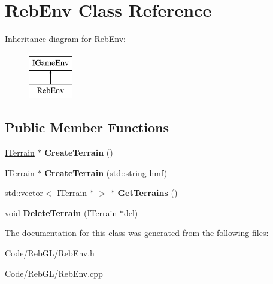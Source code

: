 \hypertarget{class_reb_env}{}\section{Reb\+Env Class Reference}
\label{class_reb_env}
Inheritance diagram for Reb\+Env\+:\begin{figure}[H]
\begin{center}
\leavevmode
\includegraphics[height=2.000000cm]{class_reb_env}
\end{center}
\end{figure}
\subsection*{Public Member Functions}
\begin{DoxyCompactItemize}
\item 
\hyperlink{class_i_terrain}{I\+Terrain} $\ast$ {\bfseries Create\+Terrain} ()\hypertarget{class_reb_env_a3748a218a3f1423a5f41353ae32bfed7}{}\label{class_reb_env_a3748a218a3f1423a5f41353ae32bfed7}

\item 
\hyperlink{class_i_terrain}{I\+Terrain} $\ast$ {\bfseries Create\+Terrain} (std\+::string hmf)\hypertarget{class_reb_env_ab082c1fcb061d9b6dfd4d67a5156874e}{}\label{class_reb_env_ab082c1fcb061d9b6dfd4d67a5156874e}

\item 
std\+::vector$<$ \hyperlink{class_i_terrain}{I\+Terrain} $\ast$ $>$ $\ast$ {\bfseries Get\+Terrains} ()\hypertarget{class_reb_env_abb92f4b2aab9d000ddcb74b7cf8470ea}{}\label{class_reb_env_abb92f4b2aab9d000ddcb74b7cf8470ea}

\item 
void {\bfseries Delete\+Terrain} (\hyperlink{class_i_terrain}{I\+Terrain} $\ast$del)\hypertarget{class_reb_env_a26d45064c84264785a2b7b7e993dc858}{}\label{class_reb_env_a26d45064c84264785a2b7b7e993dc858}

\end{DoxyCompactItemize}


The documentation for this class was generated from the following files\+:\begin{DoxyCompactItemize}
\item 
Code/\+Reb\+G\+L/Reb\+Env.\+h\item 
Code/\+Reb\+G\+L/Reb\+Env.\+cpp\end{DoxyCompactItemize}
